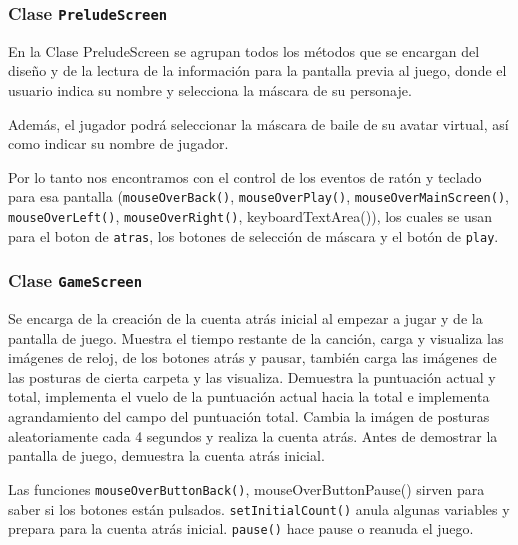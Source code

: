 \documentclass[10pt,a4paper]{report}
\begin{document}
	

	 
	 \subsubsection{Clase \texttt{PreludeScreen}}
	 En la Clase PreludeScreen se agrupan todos los métodos que se encargan del diseño y de la lectura de la información para la pantalla previa al juego, donde el usuario indica su nombre y selecciona la máscara de su personaje.
	 
	Además, el jugador podrá seleccionar la máscara de baile de su avatar virtual, así como indicar su nombre de jugador.
	
	
	 
Por lo tanto nos encontramos con el control de los eventos de ratón y teclado para esa pantalla (\texttt{mouseOverBack()},  \texttt{mouseOverPlay()}, \texttt{mouseOverMainScreen()}, \texttt{mouseOverLeft()}, \texttt{mouseOverRight()}, keyboardTextArea()), los cuales se usan para el boton de \texttt{atras}, los botones de selección de máscara y el botón de \texttt{play}.

	
	 
	 \subsubsection{Clase \texttt{GameScreen}}\label{class:gamescreen}
	 Se encarga de la creación de la cuenta atrás inicial al empezar a jugar y de la pantalla de juego. Muestra el tiempo restante de la canción, carga y visualiza las imágenes de reloj, de los botones atrás y pausar, también carga las imágenes de las posturas de cierta carpeta y las visualiza. Demuestra la puntuación actual y total, implementa el vuelo de la puntuación actual hacia la total e implementa agrandamiento del campo del puntuación total. Cambia la imágen de posturas aleatoriamente cada 4 segundos y realiza la cuenta atrás.
Antes de demostrar la pantalla de juego, demuestra la cuenta atrás inicial.

	Las funciones \texttt{mouseOverButtonBack()}, mouseOverButtonPause() sirven para saber si los botones están pulsados. \texttt{setInitialCount()} anula algunas variables y prepara para la cuenta atrás inicial. \texttt{pause()} hace pause o reanuda el juego.
\end{document}
